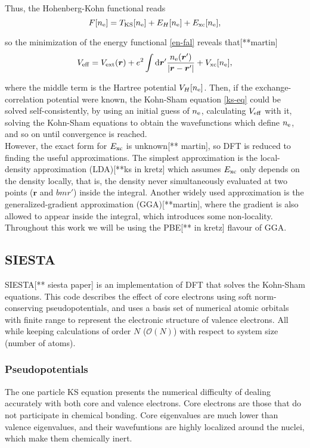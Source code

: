 Thus, the Hohenberg-Kohn functional reads
\begin{equation}
F[n_{\mathrm{e}}]=T_{\mathrm{KS}}[n_{\mathrm{e}}]+E_{H}[n_{\mathrm{e}}]+E_{\mathrm{xc}}[n_{\mathrm{e}}],
\end{equation}

so the minimization of the energy functional \ref{en-fal} reveals that[**martin]
\begin{equation}
V_{\mathrm{eff}}=V_{\mathrm{ext}}(\bm r)+e^2\int\mathrm{d}\bm r'\frac{n_{\mathrm{e}}(\bm r')}{\abs{\bm r-\bm r'}}+V_{\mathrm{xc}}[n_{\mathrm{e}}],
\end{equation}

where the middle term is the Hartree potential \(V_{H}[n_{\mathrm{e}}]\). Then, if the exchange-correlation potential were known, the Kohn-Sham equation \ref{ks-eq} could be solved self-consistently, by using an initial guess of \(n_{\mathrm{e}}\), calculating \(V_{\mathrm{eff}}\) with it, solving the Kohn-Sham equations to obtain the wavefunctions which define \(n_{\mathrm{e}}\), and so on until convergence is reached.\\

However, the exact form for \(E_{\mathrm{xc}}\) is unknown[** martin], so DFT is reduced to finding the useful approximations. The simplest approximation is the local-density approximation (LDA)[**ks in kretz] which assumes \(E_{\mathrm{xc}}\) only depends on the density locally, that is, the density never simultaneously evaluated at two points (\(\bm r\) and \(bm r'\)) inside the integral. Another widely used approximation is the generalized-gradient approximation (GGA)[**martin], where the gradient is also allowed to appear inside the integral, which introduces some non-locality. Throughout this work we will be using the PBE[** in kretz] flavour of GGA.


\subsection{SIESTA}
SIESTA[** siesta paper] is an implementation of DFT that solves the Kohn-Sham equations. This code describes the effect of core electrons using soft norm-conserving pseudopotentials, and uses a basis set of numerical atomic orbitals with finite range to represent the electronic structure of valence electrons. All while keeping calculations of order \(N\) (\(\mathcal O(N)\)) with respect to system size (number of atoms).

\subsubsection*{Pseudopotentials}
The one particle KS equation presents the numerical difficulty of dealing accurately with both core and valence electrons. Core electrons are those that do not participate in chemical bonding. Core eigenvalues are much lower than valence eigenvalues, and their wavefuntions are highly localized around the nuclei, which make them chemically inert.\\

